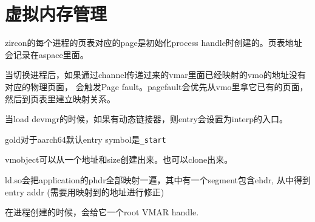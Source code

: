 \section{虚拟内存管理}
zircon的每个进程的页表对应的page是初始化process handle时创建的。页表地址
会记录在aspace里面。

当切换进程后，如果通过channel传递过来的vmar里面已经映射的vmo的地址没有对应的物理页面，
会触发Page fault。pagefault会优先从vmo里拿它已有的页面，然后到页表里建立映射关系。

当load devmgr的时候，如果有动态链接器，则entry会设置为interp的入口。

gold对于aarch64默认entry symbol是\verb|_start|

vmobject可以从一个地址和size创建出来。也可以clone出来。

ld.so会把application的phdr全部映射一遍，其中有一个segment包含ehdr, 从中得到entry addr (需要用映射到的地址进行修正)



在进程创建的时候，会给它一个root VMAR handle.
